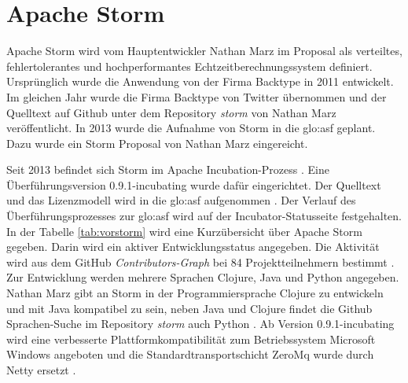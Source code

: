 \section{Apache Storm}
\label{section:storm}

Apache Storm wird vom Hauptentwickler Nathan Marz im Proposal als verteiltes, fehlertolerantes und hochperformantes Echtzeitberechnungssystem definiert. Ursprünglich wurde die Anwendung von der Firma Backtype in 2011 entwickelt. Im gleichen Jahr wurde die Firma Backtype von Twitter übernommen und der Quelltext auf Github  unter dem Repository \textit{storm}  von Nathan Marz veröffentlicht. In 2013 wurde die Aufnahme von Storm in die \gls{glo:asf} geplant. Dazu wurde ein Storm Proposal von Nathan Marz eingereicht.  

Seit 2013 befindet sich Storm im Apache Incubation-Prozess . Eine Überführungsversion 0.9.1-incubating wurde dafür eingerichtet. Der Quelltext und das Lizenzmodell wird in die \gls{glo:asf} aufgenommen . Der Verlauf des Überführungsprozesses zur \gls{glo:asf} wird auf der Incubator-Statusseite  festgehalten. In der Tabelle \ref{tab:vorstorm} wird eine Kurzübersicht über Apache Storm gegeben. Darin wird ein aktiver Entwicklungsstatus angegeben. Die Aktivität wird aus dem GitHub \textit{Contributors-Graph} bei 84 Projektteilnehmern bestimmt . Zur Entwicklung werden mehrere Sprachen Clojure, Java und Python angegeben. Nathan Marz gibt an Storm in der Programmiersprache Clojure  zu entwickeln und mit Java   kompatibel zu sein, neben Java und Clojure  findet die Github Sprachen-Suche  im Repository \textit{storm} auch Python . Ab Version 0.9.1-incubating wird eine verbesserte Plattformkompatibilität zum Betriebssystem Microsoft Windows angeboten und die Standardtransportschicht ZeroMq  wurde durch Netty  ersetzt .

